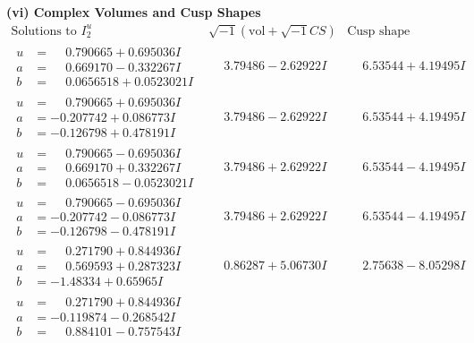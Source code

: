 \documentclass[1p]{elsarticle_modified}
\theoremstyle{definition}
\newcommand{\I}{\sqrt{-1}}
\begin{document}
\newpage\flushleft \textbf{(vi) Complex Volumes and Cusp Shapes}
$$\begin{array}{c|c|c}  
\text{Solutions to }I^u_{2}& \I (\text{vol} + \sqrt{-1}CS) & \text{Cusp shape}\\
 \hline 
\begin{aligned}
u &= \phantom{-}0.790665 + 0.695036 I \\
a &= \phantom{-}0.669170 - 0.332267 I \\
b &= \phantom{-}0.0656518 + 0.0523021 I\end{aligned}
 & \phantom{-}3.79486 - 2.62922 I & \phantom{-}6.53544 + 4.19495 I \\ \hline\begin{aligned}
u &= \phantom{-}0.790665 + 0.695036 I \\
a &= -0.207742 + 0.086773 I \\
b &= -0.126798 + 0.478191 I\end{aligned}
 & \phantom{-}3.79486 - 2.62922 I & \phantom{-}6.53544 + 4.19495 I \\ \hline\begin{aligned}
u &= \phantom{-}0.790665 - 0.695036 I \\
a &= \phantom{-}0.669170 + 0.332267 I \\
b &= \phantom{-}0.0656518 - 0.0523021 I\end{aligned}
 & \phantom{-}3.79486 + 2.62922 I & \phantom{-}6.53544 - 4.19495 I \\ \hline\begin{aligned}
u &= \phantom{-}0.790665 - 0.695036 I \\
a &= -0.207742 - 0.086773 I \\
b &= -0.126798 - 0.478191 I\end{aligned}
 & \phantom{-}3.79486 + 2.62922 I & \phantom{-}6.53544 - 4.19495 I \\ \hline\begin{aligned}
u &= \phantom{-}0.271790 + 0.844936 I \\
a &= \phantom{-}0.569593 + 0.287323 I \\
b &= -1.48334 + 0.65965 I\end{aligned}
 & \phantom{-}0.86287 + 5.06730 I & \phantom{-}2.75638 - 8.05298 I \\ \hline\begin{aligned}
u &= \phantom{-}0.271790 + 0.844936 I \\
a &= -0.119874 - 0.268542 I \\
b &= \phantom{-}0.884101 - 0.757543 I\end{aligned}

\end{array}$$
\end{document}
